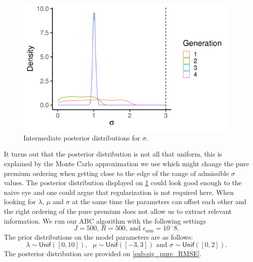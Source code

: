 \documentclass[10pt]{article}
\newcommand*{\UnifDist}{\mathsf{Unif}}
\begin{document}
\begin{figure}[!ht]
  \begin{center}
  \includegraphics[width=0.7\linewidth]{../figures/posterior_sig_iso_supp_mat}
    \caption{Intermediate posterior distributions for $\sigma$.}
    \label{fig:posterior_sig_iso_supp_mat}
  \end{center}
\end{figure}

It turns out that the posterior distribution is not all that uniform, this is explained by the Monte Carlo approximation we use which might change the pure premium ordering when getting close to the edge of the range of admissible $\sigma$ values. The posterior distribution displayed on \cref{fig:posterior_sig_iso_supp_mat} could look good enough to the naive eye and one could argue that regularization is not required here. When looking for $\lambda$, $\mu$ and $\sigma$ at the same time the parameters can offset each other and the right ordering of the pure premium does not allow us to extract relevant information. We run our ABC algorithm with the following settings 
$$
J = 500\text{, }R= 500\text{, and }\epsilon_{\min} =10^-8.
$$
The prior distributions on the model parameters are as follows: 
$$
\lambda \sim \UnifDist([0, 10]),\text{ }\mu\sim \UnifDist([-3, 3])\text{ and }\sigma\sim \UnifDist([0, 2]).
$$
The posterior distribution are provided on \cref{sub:sig_pure_RMSE}.
\end{document}
